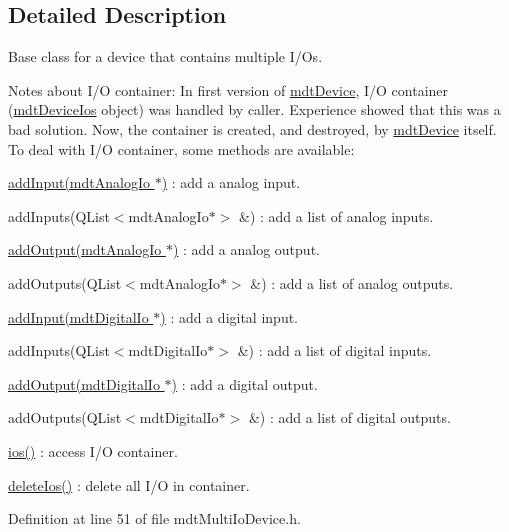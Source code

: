 \subsection{Detailed Description}
Base class for a device that contains multiple I/\-Os. 

Notes about I/\-O container\-: In first version of \hyperlink{classmdt_device}{mdt\-Device}, I/\-O container (\hyperlink{classmdt_device_ios}{mdt\-Device\-Ios} object) was handled by caller. Experience showed that this was a bad solution. Now, the container is created, and destroyed, by \hyperlink{classmdt_device}{mdt\-Device} itself. To deal with I/\-O container, some methods are available\-:
\begin{DoxyItemize}
\item \hyperlink{classmdt_multi_io_device_a7eac1455f50951f25a860ef22eb53cd6}{add\-Input(mdt\-Analog\-Io $\ast$)} \-: add a analog input.
\item add\-Inputs(\-Q\-List$<$mdt\-Analog\-Io$\ast$$>$ \&) \-: add a list of analog inputs.
\item \hyperlink{classmdt_multi_io_device_afef971431b2db32e31994d18aa3a6522}{add\-Output(mdt\-Analog\-Io $\ast$)} \-: add a analog output.
\item add\-Outputs(\-Q\-List$<$mdt\-Analog\-Io$\ast$$>$ \&) \-: add a list of analog outputs.
\item \hyperlink{classmdt_multi_io_device_ada49d6af77fc3b6e435d14b6254d5862}{add\-Input(mdt\-Digital\-Io $\ast$)} \-: add a digital input.
\item add\-Inputs(\-Q\-List$<$mdt\-Digital\-Io$\ast$$>$ \&) \-: add a list of digital inputs.
\item \hyperlink{classmdt_multi_io_device_aaeda5a4dba892677f7c63e621dade8b0}{add\-Output(mdt\-Digital\-Io $\ast$)} \-: add a digital output.
\item add\-Outputs(\-Q\-List$<$mdt\-Digital\-Io$\ast$$>$ \&) \-: add a list of digital outputs.
\item \hyperlink{classmdt_multi_io_device_a1acf6876006ca28b93a6ad0be0b39eff}{ios()} \-: access I/\-O container.
\item \hyperlink{classmdt_multi_io_device_ae712551100e5c45eaaf197dd9e409716}{delete\-Ios()} \-: delete all I/\-O in container. 
\end{DoxyItemize}

Definition at line 51 of file mdt\-Multi\-Io\-Device.\-h.



